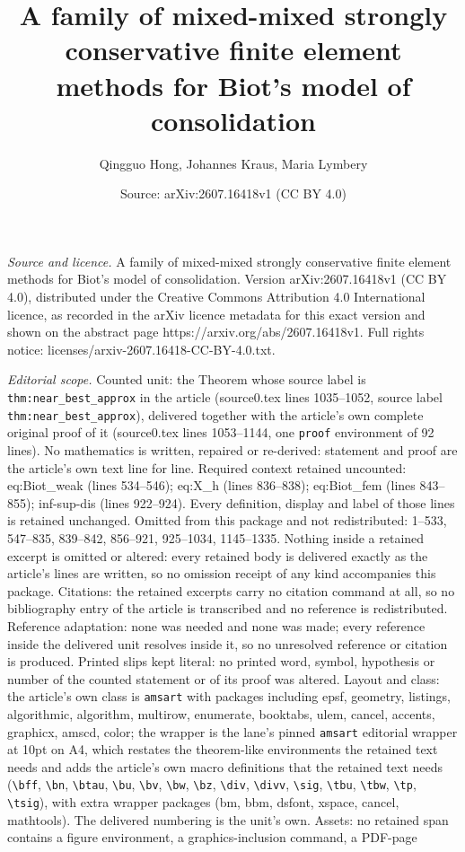 \documentclass[10pt,a4paper]{amsart}
\title[A family of mixed-mixed strongly conservative finite element]{A family of mixed-mixed strongly conservative finite element methods for Biot's model of consolidation}
\author{Qingguo Hong, Johannes Kraus, Maria Lymbery}
\date{Source: arXiv:2607.16418v1 (CC BY 4.0)}
\begin{document}
\maketitle

\noindent\emph{Source and licence.} A family of mixed-mixed strongly conservative finite element methods for Biot's model of consolidation. Version arXiv:2607.16418v1 (CC BY 4.0), distributed under the Creative Commons Attribution 4.0 International licence, as recorded in the arXiv licence metadata for this exact version and shown on the abstract page https://arxiv.org/abs/2607.16418v1. Full rights notice: licenses/arxiv-2607.16418-CC-BY-4.0.txt.\par\smallskip

\noindent\textit{Editorial scope.} Counted unit: the Theorem whose source label is \texttt{thm:near\_best\_approx} in the article (source0.tex lines 1035--1052, source label \texttt{thm:near\_best\_approx}), delivered together with the article's own complete original proof of it (source0.tex lines 1053--1144, one \texttt{proof} environment of 92 lines). No mathematics is written, repaired or re-derived: statement and proof are the article's own text line for line. Required context retained uncounted: eq:Biot\_weak (lines 534--546); eq:X\_h (lines 836--838); eq:Biot\_fem (lines 843--855); inf-sup-dis (lines 922--924). Every definition, display and label of those lines is retained unchanged. Omitted from this package and not redistributed: 1--533, 547--835, 839--842, 856--921, 925--1034, 1145--1335. Nothing inside a retained excerpt is omitted or altered: every retained body is delivered exactly as the article's lines are written, so no omission receipt of any kind accompanies this package. Citations: the retained excerpts carry no citation command at all, so no bibliography entry of the article is transcribed and no reference is redistributed. Reference adaptation: none was needed and none was made; every reference inside the delivered unit resolves inside it, so no unresolved reference or citation is produced. Printed slips kept literal: no printed word, symbol, hypothesis or number of the counted statement or of its proof was altered. Layout and class: the article's own class is \texttt{amsart} with packages including epsf, geometry, listings, algorithmic, algorithm, multirow, enumerate, booktabs, ulem, cancel, accents, graphicx, amscd, color; the wrapper is the lane's pinned \texttt{amsart} editorial wrapper at 10pt on A4, which restates the theorem-like environments the retained text needs and adds the article's own macro definitions that the retained text needs (\texttt{\textbackslash bff}, \texttt{\textbackslash bn}, \texttt{\textbackslash btau}, \texttt{\textbackslash bu}, \texttt{\textbackslash bv}, \texttt{\textbackslash bw}, \texttt{\textbackslash bz}, \texttt{\textbackslash div}, \texttt{\textbackslash divv}, \texttt{\textbackslash sig}, \texttt{\textbackslash tbu}, \texttt{\textbackslash tbw}, \texttt{\textbackslash tp}, \texttt{\textbackslash tsig}), with extra wrapper packages (bm, bbm, dsfont, xspace, cancel, mathtools). The delivered numbering is the unit's own. Assets: no retained span contains a figure environment, a graphics-inclusion command, a PDF-page 
\end{document}
